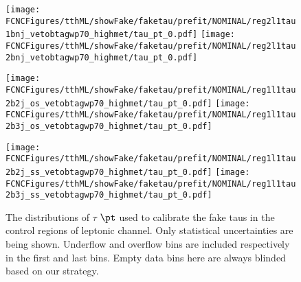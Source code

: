 \begin{figure}[H]
\centering
\caption{ The distributions of $\tau$ $\pt$ used to calibrate the fake taus in the control regions of leptonic channel. Only statistical uncertainties are being shown. Underflow and overflow bins are included respectively in the first and last bins. Empty data bins here are always blinded based on our strategy.}
\label{fig:wjet_pt_CR}
\texttt{[image: \\FCNCFigures/tthML/showFake/faketau/prefit/NOMINAL/reg2l1tau1bnj\_vetobtagwp70\_highmet/tau\_pt\_0.pdf]}
\texttt{[image: \\FCNCFigures/tthML/showFake/faketau/prefit/NOMINAL/reg2l1tau2bnj\_vetobtagwp70\_highmet/tau\_pt\_0.pdf]}

\texttt{[image: \\FCNCFigures/tthML/showFake/faketau/prefit/NOMINAL/reg1l1tau2b2j\_os\_vetobtagwp70\_highmet/tau\_pt\_0.pdf]}
\texttt{[image: \\FCNCFigures/tthML/showFake/faketau/prefit/NOMINAL/reg1l1tau2b3j\_os\_vetobtagwp70\_highmet/tau\_pt\_0.pdf]}

\texttt{[image: \\FCNCFigures/tthML/showFake/faketau/prefit/NOMINAL/reg1l1tau2b2j\_ss\_vetobtagwp70\_highmet/tau\_pt\_0.pdf]}
\texttt{[image: \\FCNCFigures/tthML/showFake/faketau/prefit/NOMINAL/reg1l1tau2b3j\_ss\_vetobtagwp70\_highmet/tau\_pt\_0.pdf]}
\end{figure}
